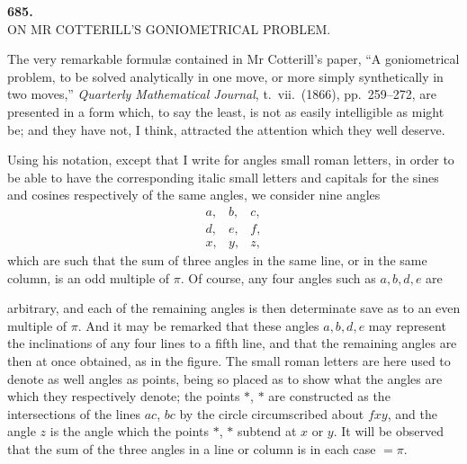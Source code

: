 \documentclass[11pt,a4paper]{article}
\begin{document}
\newpage



\begin{center}
\textbf{685.}\\[6pt]
\large ON MR COTTERILL'S GONIOMETRICAL PROBLEM.
\end{center}

\medskip


\medskip

The very remarkable formul\ae{} contained in Mr Cotterill's paper, ``A goniometrical problem, to be solved analytically in one move, or more simply synthetically in two moves,'' \emph{Quarterly Mathematical Journal}, t.~vii.\ (1866), pp.~259--272, are presented in a form which, to say the least, is not as easily intelligible as might be; and they have not, I think, attracted the attention which they well deserve.

\medskip

Using his notation, except that I write for angles small roman letters, in order to be able to have the corresponding italic small letters and capitals for the sines and cosines respectively of the same angles, we consider nine angles
\[
\begin{array}{ccc}
a, & b, & c,\\
d, & e, & f,\\
x, & y, & z,
\end{array}
\]
which are such that the sum of three angles in the same line, or in the same column, is an odd multiple of $\pi$. Of course, any four angles such as $a, b, d, e$ are

\newpage


arbitrary, and each of the remaining angles is then determinate save as to an even multiple of $\pi$. And it may be remarked that these angles $a, b, d, e$ may represent the inclinations of any four lines to a fifth line, and that the remaining angles are then at once obtained, as in the figure. The small roman letters are here used to denote as well angles as points, being so placed as to show what the angles are which they respectively denote; the points $*$, $*$ are constructed as the intersections of the lines $ac$, $bc$ by the circle circumscribed about $fxy$, and the angle $z$ is the angle which the points $*$, $*$ subtend at $x$ or $y$. It will be observed that the sum of the three angles in a line or column is in each case $= \pi$.
\end{document}

